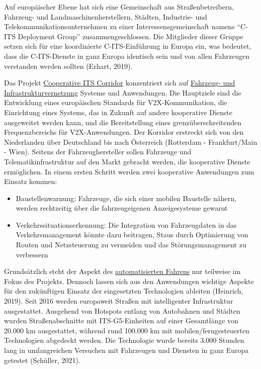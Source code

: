 \documentclass[
]{book}
\providecommand{\tightlist}{%
  \setlength{\itemsep}{0pt}\setlength{\parskip}{0pt}}
\begin{document}
Auf europäischer Ebene hat sich eine Gemeinschaft aus Straßenbetreibern, Fahrzeug- und Landmaschinenherstellern, Städten, Industrie- und Telekommunikationsunternehmen zu einer Interessensgemeinschaft namens ``C-ITS Deployment Group'' zusammengeschlossen. Die Mitglieder dieser Gruppe setzen sich für eine koordinierte C-ITS-Einführung in Europa ein, was bedeutet, dass die C-ITS-Dienste in ganz Europa identisch sein und von allen Fahrzeugen verstanden werden sollten (Erhart, 2019).

Das Projekt \href{http://eco-at.info/c-its-corridor-video.html}{Cooperative ITS Corridor} konzentriert sich auf \protect\hyperlink{v2x}{Fahrzeug- und Infrastrukturvernetzung} Systeme und Anwendungen. Die Hauptziele sind die Entwicklung eines europäischen Standards für V2X-Kommunikation, die Einrichtung eines Systems, das in Zukunft auf andere kooperative Dienste ausgeweitet werden kann, und die Bereitstellung eines grenzüberschreitenden Frequenzbereichs für V2X-Anwendungen. Der Korridor erstreckt sich von den Niederlanden über Deutschland bis nach Österreich (Rotterdam - Frankfurt/Main - Wien). Seitens der Fahrzeughersteller sollen Fahrzeuge und Telematikinfrastruktur auf den Markt gebracht werden, die kooperative Dienste ermöglichen. In einem ersten Schritt werden zwei kooperative Anwendungen zum Einsatz kommen:

\begin{itemize}
\tightlist
\item
  Baustellenwarnung: Fahrzeuge, die sich einer mobilen Baustelle nähern, werden rechtzeitig über die fahrzeugeigenen Anzeigesysteme gewarnt
\item
  Verkehrssituationserkennung: Die Integration von Fahrzeugdaten in das Verkehrsmanagement könnte dazu beitragen, Staus durch Optimierung von Routen und Netzsteuerung zu vermeiden und das Störungsmanagement zu verbessern
\end{itemize}

Grundsätzlich steht der Aspekt des \protect\hyperlink{connected}{automatisierten Fahrens} nur teilweise im Fokus des Projekts. Dennoch lassen sich aus den Anwendungen wichtige Aspekte für den zukünftigen Einsatz der eingesetzten Technologien ableiten (Heinrich, 2019). Seit 2016 werden europaweit Straßen mit intelligenter Infrastruktur ausgestattet. Ausgehend von Hotspots entlang von Autobahnen und Städten wurden Straßenabschnitte mit ITS-G5-Einheiten auf einer Gesamtlänge von 20.000 km ausgestattet, während rund 100.000 km mit mobilen/ferngesteuerten Technologien abgedeckt werden. Die Technologie wurde bereits 3.000 Stunden lang in umfangreichen Versuchen mit Fahrzeugen und Diensten in ganz Europa getestet (Schüller, 2021).
\end{document}
